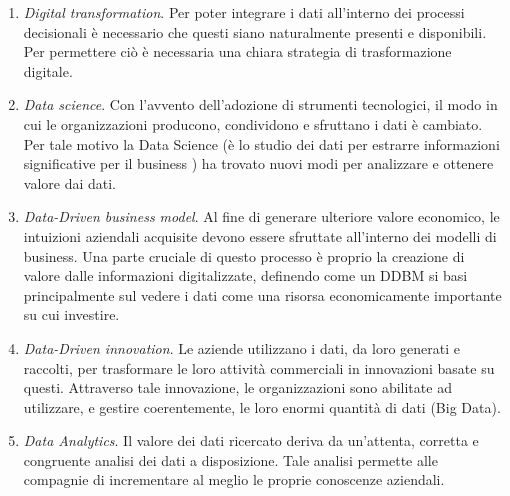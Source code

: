 \begin{enumerate}
    \item \textit{Digital transformation}. Per poter integrare i dati all'interno dei processi decisionali è necessario che questi siano naturalmente presenti e disponibili. Per permettere ciò è necessaria una chiara strategia di trasformazione digitale.
    \item \textit{Data science}. Con l'avvento dell'adozione di strumenti tecnologici, il modo in cui le organizzazioni producono, condividono e sfruttano i dati è cambiato. Per tale motivo la Data Science (è lo studio dei dati per estrarre informazioni significative per il business ) ha trovato nuovi modi per analizzare e ottenere valore dai dati.
    \item \textit{Data-Driven business model}. Al fine di generare ulteriore valore economico, le intuizioni aziendali acquisite devono essere sfruttate all'interno dei modelli di business. Una parte cruciale di questo processo è proprio la creazione di valore dalle informazioni digitalizzate, definendo come un DDBM si basi principalmente sul vedere i dati come una risorsa economicamente importante su cui investire.
    \item \textit{Data-Driven innovation}. Le aziende utilizzano i dati, da loro generati e raccolti, per trasformare le loro attività commerciali in innovazioni basate su questi. Attraverso tale innovazione, le organizzazioni sono abilitate ad utilizzare, e gestire coerentemente, le loro enormi quantità di dati (Big Data).
    \item \textit{Data Analytics}. Il valore dei dati ricercato deriva da un'attenta, corretta e congruente analisi dei dati a disposizione. Tale analisi permette alle compagnie di incrementare al meglio le proprie conoscenze aziendali.
\end{enumerate}


